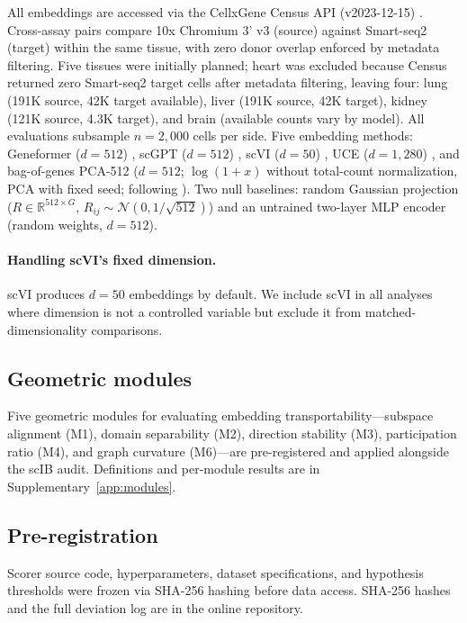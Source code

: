 \documentclass[11pt]{article}
\begin{document}
All embeddings are accessed via the CellxGene Census API (v2023-12-15) \citep{abdulla2025cellxgene}. Cross-assay pairs compare 10x Chromium 3' v3 (source) against Smart-seq2 (target) within the same tissue, with zero donor overlap enforced by metadata filtering. Five tissues were initially planned; heart was excluded because Census returned zero Smart-seq2 target cells after metadata filtering, leaving four: lung (191K source, 42K target available), liver (191K source, 42K target), kidney (121K source, 4.3K target), and brain (available counts vary by model). All evaluations subsample $n = 2{,}000$ cells per side. Five embedding methods: Geneformer ($d = 512$) \citep{theodoris2023geneformer}, scGPT ($d = 512$) \citep{cui2024scgpt}, scVI ($d = 50$) \citep{lopez2018scvi}, UCE ($d = 1{,}280$) \citep{rosen2026uce}, and bag-of-genes PCA-512 ($d = 512$; $\log(1 + x)$ without total-count normalization, PCA with fixed seed; following \citealp{cole2026morpheus}). Two null baselines: random Gaussian projection ($R \in \mathbb{R}^{512 \times G}$, $R_{ij} \sim \mathcal{N}(0, 1/\sqrt{512})$) and an untrained two-layer MLP encoder (random weights, $d = 512$).

\paragraph{Handling scVI's fixed dimension.} scVI produces $d = 50$ embeddings by default. We include scVI in all analyses where dimension is not a controlled variable but exclude it from matched-dimensionality comparisons.

\subsection{Geometric modules}

Five geometric modules for evaluating embedding transportability---subspace alignment (M1), domain separability (M2), direction stability (M3), participation ratio (M4), and graph curvature (M6)---are pre-registered and applied alongside the scIB audit. Definitions and per-module results are in Supplementary~\ref{app:modules}.

\subsection{Pre-registration}

Scorer source code, hyperparameters, dataset specifications, and hypothesis thresholds were frozen via SHA-256 hashing before data access. SHA-256 hashes and the full deviation log are in the online repository.
\end{document}
